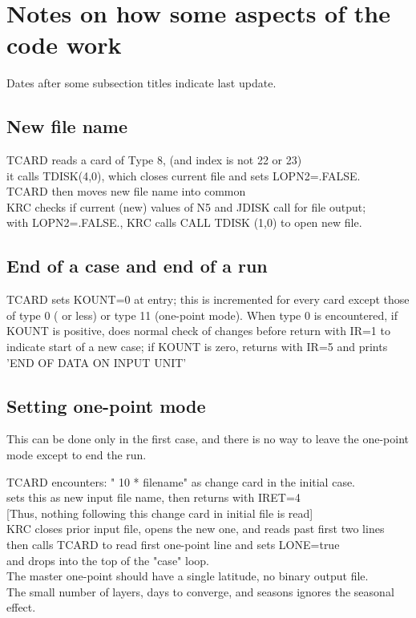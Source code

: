 \documentclass{article}
\newcommand{\qi}{\\ \hspace*{2.em}}      %
\newcommand{\qii}{\\ \hspace*{4.em}}     %
\begin{document}

\section{Notes on how some aspects of the code work} %
Dates after some subsection titles indicate last update.

\subsection{New file name}%
TCARD reads a card of Type 8, (and index is not 22 or 23)
\qi it calls  TDISK(4,0), which closes current file and sets  LOPN2=.FALSE.
\qii   TCARD then moves new file name into common \\
KRC checks if current (new) values of N5 and JDISK call for file output;
\qi  with  LOPN2=.FALSE., KRC calls CALL TDISK (1,0) to open new file.

\subsection{End of a case and end of a run}%
TCARD sets KOUNT=0 at entry; this is incremented for every card except those of
type 0 ( or less) or type 11 (one-point mode). When type 0 is encountered, if
KOUNT is positive, does normal check of changes before return with IR=1 to
indicate start of a new case; if KOUNT is zero, returns with IR=5 and prints
'END OF DATA ON INPUT UNIT'

\subsection{Setting one-point mode}%
This can be done only in the first case, and there is no way to leave the 
one-point mode except to end the run.

TCARD encounters: " 10 * filename" as change card in the initial case.
\qi   sets this as new input file name, then returns with IRET=4 
\qi  [Thus, nothing following this change card in initial file is read] \\
KRC closes prior input file, opens the new one, and reads past first two lines 
\qi     then calls TCARD to read first one-point line and sets LONE=true
\qi     and drops into the top of the "case" loop. \\ 
The master one-point should have a single latitude, no binary output file. \\
The small number of layers, days to converge, and seasons ignores the seasonal 
effect.
\end{document}
